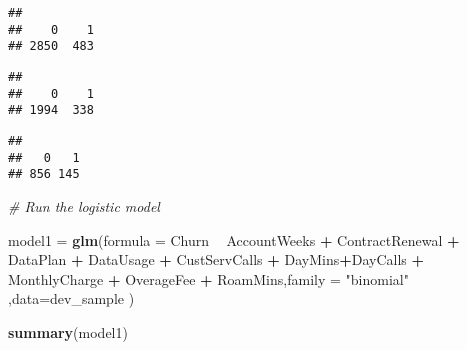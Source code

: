 \documentclass[]{article}
\newenvironment{Shaded}{\begin{snugshade}}{\end{snugshade}}
\newcommand{\KeywordTok}[1]{\textcolor[rgb]{0.13,0.29,0.53}{\textbf{#1}}}
\newcommand{\DataTypeTok}[1]{\textcolor[rgb]{0.13,0.29,0.53}{#1}}
\newcommand{\StringTok}[1]{\textcolor[rgb]{0.31,0.60,0.02}{#1}}
\newcommand{\CommentTok}[1]{\textcolor[rgb]{0.56,0.35,0.01}{\textit{#1}}}
\newcommand{\OperatorTok}[1]{\textcolor[rgb]{0.81,0.36,0.00}{\textbf{#1}}}
\newcommand{\NormalTok}[1]{#1}
\begin{document}
\begin{verbatim}
## 
##    0    1 
## 2850  483
\end{verbatim}

\begin{Shaded}
\end{Shaded}

\begin{verbatim}
## 
##    0    1 
## 1994  338
\end{verbatim}

\begin{Shaded}
\end{Shaded}

\begin{verbatim}
## 
##   0   1 
## 856 145
\end{verbatim}

\begin{Shaded}
\begin{Highlighting}[]
  \CommentTok{# Run the logistic model }
  
  
  
\NormalTok{  model1 =}\StringTok{ }\KeywordTok{glm}\NormalTok{(}\DataTypeTok{formula =}\NormalTok{ Churn }\OperatorTok{~}\StringTok{   }\NormalTok{AccountWeeks }\OperatorTok{+}\StringTok{ }\NormalTok{ContractRenewal }\OperatorTok{+}\StringTok{ }\NormalTok{DataPlan }\OperatorTok{+}\StringTok{ }\NormalTok{DataUsage }\OperatorTok{+}\StringTok{ }\NormalTok{CustServCalls }\OperatorTok{+}\StringTok{ }\NormalTok{DayMins}\OperatorTok{+}\NormalTok{DayCalls }\OperatorTok{+}\StringTok{ }\NormalTok{MonthlyCharge }\OperatorTok{+}\StringTok{ }\NormalTok{OverageFee }\OperatorTok{+}\StringTok{ }\NormalTok{RoamMins,}\DataTypeTok{family =} \StringTok{"binomial"}\NormalTok{ ,}\DataTypeTok{data=}\NormalTok{dev_sample )}

  \KeywordTok{summary}\NormalTok{(model1)}
\end{Highlighting}
\end{Shaded}
\end{document}
